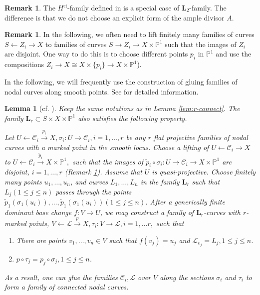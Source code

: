 \documentclass{amsart}
\newtheorem{lem}[theorem]{Lemma}
\theoremstyle{definition}
\newtheorem{rem}[theorem]{Remark}
\theoremstyle{remark}
\newcommand{\mbb}{\mathbb}
\newcommand{\PP}{\mbb{P}}
\newcommand{\ci}{\text{ci}}
\begin{document}
\begin{rem}\label{rem:L=hci}
    The $H^\ci$-family  defined in \cite[(28)]{Kollar_Tian} is a special case of $\mathbf{L}_2$-family. The difference is that we do not choose an explicit form of the ample divisor $A$.
\end{rem}
\begin{rem}\label{const:lifting}
     In the following, we often need to lift finitely many families of curves $S \leftarrow Z_i \to X$ to families of curves $S \to {Z}_i \to X \times \PP^1$ such that the images of ${Z}_i$ are disjoint.
     One way to do this is to choose different points $p_{i}$ in $\PP^1$ and use the compositions $Z_i \to X \cong X\times \{p_{i}\} \to X \times \PP^1$).   
\end{rem}

In the following, we will frequently use the construction of gluing families of nodal curves along smooth points. See \cite[Theorem 3.4]{Knudsen_projectivity_2} for detailed information.


\begin{lem}[{cf. \cite[Corollary 29]{Kollar_Tian}}]\label{lem:join}
    Keep the same notations as in Lemma \ref{lem:r-connect}. 
    The family $\mathbf{L}_r \subset S\times X \times \PP^1$ also satisfies the following property.

    Let $U \leftarrow \mathcal{C}_i \xrightarrow{p_i} X, \sigma_i: U \to \mathcal{C}_i, i=1, \ldots, r$ be any $r$ flat projective families of nodal curves with a marked point in the smooth locus.
    Choose a lifting of $U \leftarrow \mathcal{C}_i \to X$ to $U \leftarrow \mathcal{C}_i \xrightarrow{\tilde{p}_i} X\times \PP^1,$ such that the images of $\tilde{p}_i \circ \sigma_i:U \to \mathcal{C}_i \to X \times \PP^1$ are disjoint, $i=1, \ldots, r$ (Remark \ref{const:lifting}).
    Assume that $U$ is quasi-projective.
    Choose finitely many points $u_1, \ldots, u_n$, and curves $L_1, \ldots, L_n$ in the family $\mathbf{L}_r$ such that $L_j (1\leq j \leq n)$ passes through the points $\tilde{p}_1(\sigma_1(u_i)), \ldots, \tilde{p}_1(\sigma_1(u_i)) (1\leq j \leq n)$.
    After a generically finite dominant base change $f: V \to U$, we may construct a family of $\mathbf{L}_r$-curves with $r$-marked points, $V \leftarrow \mathcal{L} \xrightarrow{p} X, \tau_i: V \to \mathcal{L}, i=1, \ldots r,$ such that
    \begin{enumerate}
        \item There are points $v_1, \ldots, v_n \in V$ such that $f(v_j)=u_j$ and $\mathcal{L}_{v_j}=L_j, 1\leq j \leq n$.
        \item $p\circ \tau_j=p_j \circ \sigma_j, 1 \leq j \leq n$.
    \end{enumerate}
    As a result, one can glue the families $\mathcal{C}_i,\mathcal{L}$ over $V$ along the sections $\sigma_i$ and $\tau_i$ to form a family of \emph{connected} nodal curves.
\end{lem}
\end{document}
